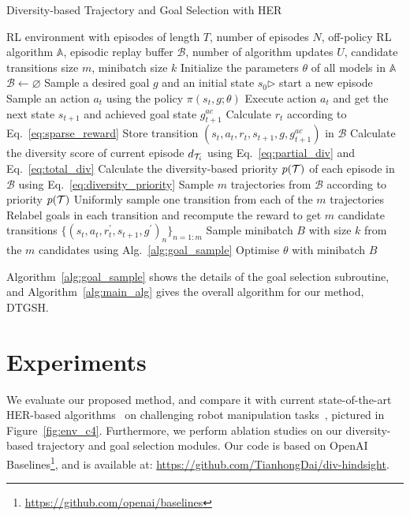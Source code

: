 \begin{algorithm}[t!]
\caption{Diversity-based Trajectory and Goal Selection with HER}
\label{alg:main_alg}
\begin{algorithmic}[1]
 \REQUIRE RL environment with episodes of length $T$, number of episodes $N$, off-policy RL algorithm $\mathbb{A}$, episodic replay buffer $\mathcal{B}$, number of algorithm updates $U$, candidate transitions size $m$, minibatch size $k$
 \STATE Initialize the parameters $\theta$ of all models in $\mathbb{A}$
 \STATE $\mathcal{B}\leftarrow\varnothing$
 \STATE Sample a desired goal $g$ and an initial state $s_{0}$\hfill{$\triangleright$ start a new episode}
 \STATE Sample an action $a_{t}$ using the policy $\pi(s_{t}, g;\theta)$
 \STATE Execute action $a_{t}$ and get the next state $s_{t+1}$ and achieved goal state $g^{ac}_{t+1}$
 \STATE Calculate $r_{t}$ according to Eq.~\eqref{eq:sparse_reward}
 \STATE Store transition $(s_t, a_t, r_t, s_{t+1}, g, g^{ac}_{t+1})$ in $\mathcal{B}$
 \ENDFOR
 \STATE Calculate the diversity score of current episode $d_{\mathcal{T}_{i}}$ using Eq.~\eqref{eq:partial_div} and Eq.~\eqref{eq:total_div}
 \STATE Calculate the diversity-based priority $p(\mathcal{T})$ of each episode in $\mathcal{B}$ using Eq.~\eqref{eq:diversity_priority}
 \STATE Sample $m$ trajectories from $\mathcal{B}$ according to priority $p(\mathcal{T})$
 \STATE Uniformly sample one transition from each of the $m$ trajectories
 \STATE Relabel goals in each transition and recompute the reward to get $m$ candidate transitions $\{(s_{t}, a_{t}, r_{t}^{\prime}, s_{t+1}, g^{\prime})_{n}\}_{n=1:m}$
 \STATE Sample minibatch $B$ with size $k$ from the $m$ candidates using Alg.~\ref{alg:goal_sample}
 \STATE Optimise $\theta$ with minibatch $B$
 \ENDFOR
 \ENDFOR 
\end{algorithmic}
\end{algorithm}

Algorithm~\ref{alg:goal_sample} shows the details of the goal selection subroutine, and Algorithm~\ref{alg:main_alg} gives the overall algorithm for our method, DTGSH.

\section{Experiments}
We evaluate our proposed method, and compare it with current state-of-the-art HER-based algorithms~\cite{andrychowicz2017hindsight,fang2019curriculum,zhao2018energy} on challenging robot manipulation tasks~\cite{plappert2018multi}, pictured in Figure~\ref{fig:env_c4}. Furthermore, we perform ablation studies on our diversity-based trajectory and goal selection modules. Our code is based on OpenAI Baselines\footnote[1]{\url{https://github.com/openai/baselines}}, and is available at: \url{https://github.com/TianhongDai/div-hindsight}.

